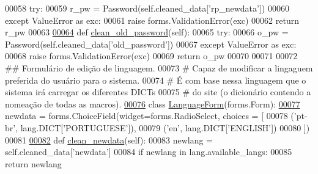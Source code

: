 \begin{DoxyCode}
00058         \textcolor{keywordflow}{try}:
00059             r\_pw = Password(self.cleaned\_data[\textcolor{stringliteral}{'rp\_newdata'}])
00060         \textcolor{keywordflow}{except} ValueError \textcolor{keyword}{as} exc:
00061             \textcolor{keywordflow}{raise} forms.ValidationError(exc)
00062         \textcolor{keywordflow}{return} r\_pw
00063 
\hypertarget{Profile_2forms_8py_source_l00064}{}\hyperlink{classProfile_1_1forms_1_1PasswordForm_a77c66c38e78db4ec954c483b50c05f13}{00064}     \textcolor{keyword}{def }\hyperlink{classProfile_1_1forms_1_1PasswordForm_a77c66c38e78db4ec954c483b50c05f13}{clean\_old\_password}(self):
00065         \textcolor{keywordflow}{try}:
00066             o\_pw = Password(self.cleaned\_data[\textcolor{stringliteral}{'old\_password'}])
00067         \textcolor{keywordflow}{except} ValueError \textcolor{keyword}{as} exc:
00068             \textcolor{keywordflow}{raise} forms.ValidationError(exc)
00069         \textcolor{keywordflow}{return} o\_pw
00070     
00071 
00072 \textcolor{comment}{## Formulário de edição de linguagem.}
00073 \textcolor{comment}{#   Capaz de modificar a lingaguem preferida do usuário para o sistema.}
00074 \textcolor{comment}{#   É com base nessa linguagem que o sistema irá carregar os diferentes DICTs}
00075 \textcolor{comment}{#   do site (o dicionário contendo a nomeação de todas as macros).}
\hypertarget{Profile_2forms_8py_source_l00076}{}\hyperlink{classProfile_1_1forms_1_1LanguageForm}{00076} \textcolor{keyword}{class }\hyperlink{classProfile_1_1forms_1_1LanguageForm}{LanguageForm}(forms.Form):
\hypertarget{Profile_2forms_8py_source_l00077}{}\hyperlink{classProfile_1_1forms_1_1LanguageForm_a327d764765fba9b8d9d82c86ca7e08a6}{00077}     newdata     = forms.ChoiceField(widget=forms.RadioSelect, choices = [
00078                                             (\textcolor{stringliteral}{'pt-br'}, lang.DICT[\textcolor{stringliteral}{'PORTUGUESE'}]),
00079                                             (\textcolor{stringliteral}{'en'}, lang.DICT[\textcolor{stringliteral}{'ENGLISH'}])
00080                                                 ])
00081 
\hypertarget{Profile_2forms_8py_source_l00082}{}\hyperlink{classProfile_1_1forms_1_1LanguageForm_aa293b46190ebac68d0d410406e83c01c}{00082}     \textcolor{keyword}{def }\hyperlink{classProfile_1_1forms_1_1LanguageForm_aa293b46190ebac68d0d410406e83c01c}{clean\_newdata}(self):
00083         newlang = self.cleaned\_data[\textcolor{stringliteral}{'newdata'}]
00084         \textcolor{keywordflow}{if} newlang \textcolor{keywordflow}{in} lang.available\_langs:
00085             \textcolor{keywordflow}{return} newlang

\end{DoxyCode}
